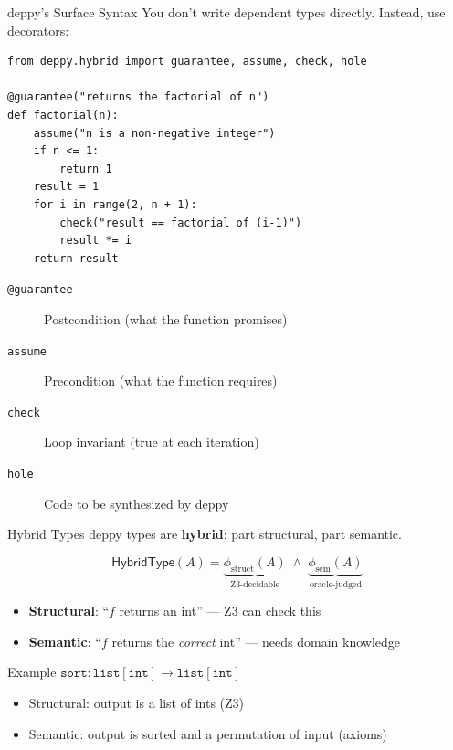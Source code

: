 \documentclass[aspectratio=169,11pt]{beamer}
\begin{document}
\begin{frame}[fragile]{deppy's Surface Syntax}
You don't write dependent types directly. Instead, use decorators:

\begin{lstlisting}[language=deppy]
from deppy.hybrid import guarantee, assume, check, hole

@guarantee("returns the factorial of n")
def factorial(n):
    assume("n is a non-negative integer")
    if n <= 1:
        return 1
    result = 1
    for i in range(2, n + 1):
        check("result == factorial of (i-1)")
        result *= i
    return result
\end{lstlisting}

\begin{description}
\item[\texttt{@guarantee}] Postcondition (what the function promises)
\item[\texttt{assume}] Precondition (what the function requires)
\item[\texttt{check}] Loop invariant (true at each iteration)
\item[\texttt{hole}] Code to be synthesized by deppy
\end{description}
\end{frame}

\begin{frame}{Hybrid Types}
deppy types are \textbf{hybrid}: part structural, part semantic.

\[
  \mathsf{HybridType}(A) = \underbrace{\phi_{\mathrm{struct}}(A)}_{\text{Z3-decidable}}
  \;\wedge\; \underbrace{\phi_{\mathrm{sem}}(A)}_{\text{oracle-judged}}
\]

\begin{itemize}
\item \textbf{Structural}: ``$f$ returns an int'' --- Z3 can check this
\item \textbf{Semantic}: ``$f$ returns the \emph{correct} int'' --- needs
  domain knowledge
\end{itemize}

\vspace{0.5em}
\begin{block}{Example}
$\mathtt{sort} : \mathtt{list[int]} \to \mathtt{list[int]}$

\begin{itemize}
\item Structural: output is a list of ints {\color{trustgreen}\checkmark} (Z3)
\item Semantic: output is sorted and a permutation of input {\color{trustgreen}\checkmark} (axioms)
\end{itemize}
\end{block}
\end{frame}
\end{document}

